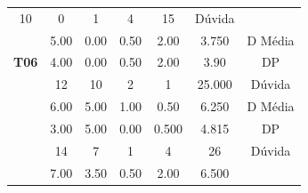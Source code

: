 \begin{table}[htbp]
\begin{tabular}{|ccccccc|}
		\multicolumn{1}{c|}{10} &
		\multicolumn{1}{c|}{0} &
		\multicolumn{1}{c|}{1} &
		\multicolumn{1}{c|}{4} &
		\multicolumn{1}{c|}{15} &
		Dúvida \\ \cline{2-7} 
		\rowcolor[HTML]{D9D9D9} 
		\multicolumn{1}{|c|}{\cellcolor[HTML]{F2F2F2}} &
		\multicolumn{1}{c|}{\cellcolor[HTML]{D9D9D9}5.00} &
		\multicolumn{1}{c|}{\cellcolor[HTML]{D9D9D9}0.00} &
		\multicolumn{1}{c|}{\cellcolor[HTML]{D9D9D9}0.50} &
		\multicolumn{1}{c|}{\cellcolor[HTML]{D9D9D9}2.00} &
		\multicolumn{1}{c|}{\cellcolor[HTML]{D9D9D9}3.750} &
		D Média \\ \cline{2-7} 
		\multicolumn{1}{|c|}{\multirow{-3}{*}{\cellcolor[HTML]{F2F2F2}\textbf{T06}}} &
		\multicolumn{1}{c|}{4.00} &
		\multicolumn{1}{c|}{0.00} &
		\multicolumn{1}{c|}{0.50} &
		\multicolumn{1}{c|}{2.00} &
		\multicolumn{1}{c|}{3.90} &
		DP \\ \hline
		\rowcolor[HTML]{D9D9D9} 
		\multicolumn{1}{|c|}{\cellcolor[HTML]{F2F2F2}} &
		\multicolumn{1}{c|}{\cellcolor[HTML]{D9D9D9}12} &
		\multicolumn{1}{c|}{\cellcolor[HTML]{D9D9D9}10} &
		\multicolumn{1}{c|}{\cellcolor[HTML]{D9D9D9}2} &
		\multicolumn{1}{c|}{\cellcolor[HTML]{D9D9D9}1} &
		\multicolumn{1}{c|}{\cellcolor[HTML]{D9D9D9}25.000} &
		Dúvida \\ \cline{2-7} 
		\multicolumn{1}{|c|}{\cellcolor[HTML]{F2F2F2}} &
		\multicolumn{1}{c|}{6.00} &
		\multicolumn{1}{c|}{5.00} &
		\multicolumn{1}{c|}{1.00} &
		\multicolumn{1}{c|}{0.50} &
		\multicolumn{1}{c|}{6.250} &
		D Média \\ \cline{2-7} 
		\rowcolor[HTML]{D9D9D9} 
		\multicolumn{1}{|c|}{\multirow{-3}{*}{\cellcolor[HTML]{F2F2F2}\textbf{T08}}} &
		\multicolumn{1}{c|}{\cellcolor[HTML]{D9D9D9}3.00} &
		\multicolumn{1}{c|}{\cellcolor[HTML]{D9D9D9}5.00} &
		\multicolumn{1}{c|}{\cellcolor[HTML]{D9D9D9}0.00} &
		\multicolumn{1}{c|}{\cellcolor[HTML]{D9D9D9}0.500} &
		\multicolumn{1}{c|}{\cellcolor[HTML]{D9D9D9}4.815} &
		DP \\ \hline
		\multicolumn{1}{|c|}{\cellcolor[HTML]{F2F2F2}} &
		\multicolumn{1}{c|}{14} &
		\multicolumn{1}{c|}{7} &
		\multicolumn{1}{c|}{1} &
		\multicolumn{1}{c|}{4} &
		\multicolumn{1}{c|}{26} &
		Dúvida \\ \cline{2-7} 
		\rowcolor[HTML]{D9D9D9} 
		\multicolumn{1}{|c|}{\cellcolor[HTML]{F2F2F2}} &
		\multicolumn{1}{c|}{\cellcolor[HTML]{D9D9D9}7.00} &
		\multicolumn{1}{c|}{\cellcolor[HTML]{D9D9D9}3.50} &
		\multicolumn{1}{c|}{\cellcolor[HTML]{D9D9D9}0.50} &
		\multicolumn{1}{c|}{\cellcolor[HTML]{D9D9D9}2.00} &
		\multicolumn{1}{c|}{\cellcolor[HTML]{D9D9D9}6.500} &

\end{tabular}
\end{table}

